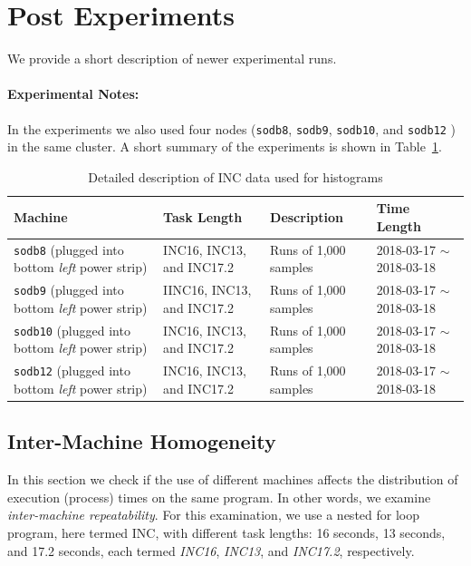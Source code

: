 
\clearpage
\newpage

\section{Post Experiments}

We provide a short description of newer experimental runs. 

\paragraph{Experimental Notes:} In the experiments 
we also used four nodes ({\tt sodb8}, {\tt sodb9}, {\tt sodb10}, and {\tt sodb12} ) in the same cluster. 
A short summary of the experiments is shown in Table~\ref{tab:exp_notes2}.

\begin{table}[h]
\begin{center}
\begin{tabular}{|p{4cm}|p{3cm}|p{4cm}|p{4cm}|} \hline
Machine & Task Length & Description & Time Length\\ \hline
{\tt sodb8} (plugged into \hbox{bottom} {\em left} power strip) &  INC16, INC13, and INC17.2 & Runs of 1,000 samples & 2018-03-17 $\sim$2018-03-18\\ \hline
{\tt sodb9}  (plugged into \hbox{bottom} {\em left} power strip)  &  IINC16, INC13, and INC17.2 & Runs of 1,000 samples & 2018-03-17 $\sim$2018-03-18\\ \hline
{\tt sodb10}  (plugged into \hbox{bottom} {\em left} power strip)  & INC16, INC13, and INC17.2 & Runs of 1,000 samples & 2018-03-17 $\sim$2018-03-18\\ \hline
{\tt sodb12}  (plugged into \hbox{bottom} {\em left} power strip)  & INC16, INC13, and INC17.2 & Runs of 1,000 samples & 2018-03-17 $\sim$2018-03-18\\ \hline
\end{tabular}
\end{center}
\vspace{-.2in}
\caption{Detailed description of INC data used for histograms\label{tab:exp_notes2}}
\end{table}

\subsection{Inter-Machine Homogeneity~\label{sec:diff_machine}} 

In this section we check if the use of different machines affects the distribution of execution (process) times on the same program. 
In other words, we examine {\em inter-machine repeatability}. For this examination, we use a nested for loop program, here termed INC, 
with different task lengths: 16 seconds, 13 seconds, and 17.2 seconds, each termed {\em INC16}, {\em INC13}, and {\em INC17.2}, respectively. 


